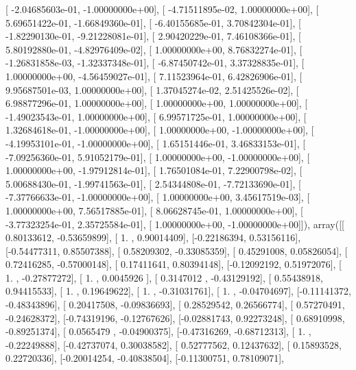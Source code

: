 \documentclass{article}
\begin{document}
       [ -2.04685603e-01,  -1.00000000e+00],
       [ -4.71511895e-02,   1.00000000e+00],
       [  5.69651422e-01,  -1.66849360e-01],
       [ -6.40155685e-01,   3.70842304e-01],
       [ -1.82290130e-01,  -9.21228081e-01],
       [  2.90420229e-01,   7.46108366e-01],
       [  5.80192880e-01,  -4.82976409e-02],
       [  1.00000000e+00,   8.76832274e-01],
       [ -1.26831858e-03,  -1.32337348e-01],
       [ -6.87450742e-01,   3.37328835e-01],
       [  1.00000000e+00,  -4.56459027e-01],
       [  7.11523964e-01,   6.42826906e-01],
       [  9.95687501e-03,   1.00000000e+00],
       [  1.37045274e-02,   2.51425526e-02],
       [  6.98877296e-01,   1.00000000e+00],
       [  1.00000000e+00,   1.00000000e+00],
       [ -1.49023543e-01,   1.00000000e+00],
       [  6.99571725e-01,   1.00000000e+00],
       [  1.32684618e-01,  -1.00000000e+00],
       [  1.00000000e+00,  -1.00000000e+00],
       [ -4.19953101e-01,  -1.00000000e+00],
       [  1.65151446e-01,   3.46833153e-01],
       [ -7.09256360e-01,   5.91052179e-01],
       [  1.00000000e+00,  -1.00000000e+00],
       [  1.00000000e+00,  -1.97912814e-01],
       [  1.76501084e-01,   7.22900798e-02],
       [  5.00688430e-01,  -1.99741563e-01],
       [  2.54344808e-01,  -7.72133690e-01],
       [ -7.37766633e-01,  -1.00000000e+00],
       [  1.00000000e+00,   3.45617519e-03],
       [  1.00000000e+00,   7.56517885e-01],
       [  8.06628745e-01,   1.00000000e+00],
       [ -3.77323254e-01,   2.35725584e-01],
       [  1.00000000e+00,  -1.00000000e+00]]), array([[ 0.80133612, -0.53659899],
       [ 1.        ,  0.90014409],
       [-0.22186394,  0.53156116],
       [-0.54477311,  0.85507388],
       [ 0.58209302, -0.33085359],
       [ 0.45291008,  0.05826054],
       [ 0.72416285, -0.57000148],
       [ 0.17411641,  0.80394148],
       [-0.12092192,  0.51972076],
       [ 1.        , -0.27877272],
       [ 1.        ,  0.0045926 ],
       [ 0.3147012 , -0.43129192],
       [ 0.55438918,  0.94415533],
       [ 1.        ,  0.19649622],
       [ 1.        , -0.31031761],
       [ 1.        , -0.04704697],
       [-0.11141372, -0.48343896],
       [ 0.20417508, -0.09836693],
       [ 0.28529542,  0.26566774],
       [ 0.57270491, -0.24628372],
       [-0.74319196, -0.12767626],
       [-0.02881743,  0.92273248],
       [ 0.68910998, -0.89251374],
       [ 0.0565479 , -0.04900375],
       [-0.47316269, -0.68712313],
       [ 1.        , -0.22249888],
       [-0.42737074,  0.30038582],
       [ 0.52777562,  0.12437632],
       [ 0.15893528,  0.22720336],
       [-0.20014254, -0.40838504],
       [-0.11300751,  0.78109071],
\end{document}
